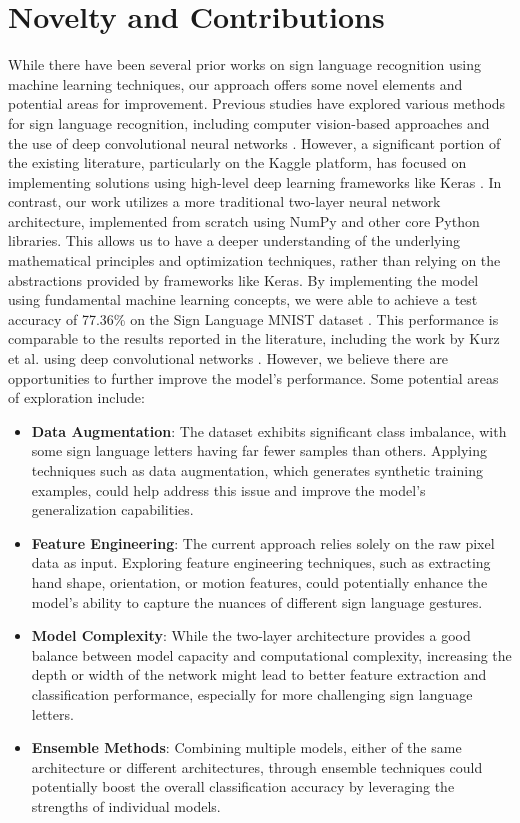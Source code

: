 \documentclass[times,final,english]{revdetua}
\begin{document}
\section{Novelty and Contributions}
While there have been several prior works on sign language recognition using machine learning techniques, our approach offers some novel elements and potential areas for improvement.
Previous studies have explored various methods for sign language recognition, including computer vision-based approaches \cite{garg, mitra} and the use of deep convolutional neural networks \cite{kurz2016using}. However, a significant portion of the existing literature, particularly on the Kaggle platform, has focused on implementing solutions using high-level deep learning frameworks like Keras \cite{kurz2016using}.
In contrast, our work utilizes a more traditional two-layer neural network architecture, implemented from scratch using NumPy and other core Python libraries. This allows us to have a deeper understanding of the underlying mathematical principles and optimization techniques, rather than relying on the abstractions provided by frameworks like Keras.
By implementing the model using fundamental machine learning concepts, we were able to achieve a test accuracy of 77.36\% on the Sign Language MNIST dataset \cite{datamunge2022}. This performance is comparable to the results reported in the literature, including the work by Kurz et al. using deep convolutional networks \cite{kurz2016using}.
However, we believe there are opportunities to further improve the model's performance. Some potential areas of exploration include:

\begin{itemize}
\item \textbf{Data Augmentation}: The dataset exhibits significant class imbalance, with some sign language letters having far fewer samples than others. Applying techniques such as data augmentation, which generates synthetic training examples, could help address this issue and improve the model's generalization capabilities.

\item \textbf{Feature Engineering}: The current approach relies solely on the raw pixel data as input. Exploring feature engineering techniques, such as extracting hand shape, orientation, or motion features, could potentially enhance the model's ability to capture the nuances of different sign language gestures.

\item \textbf{Model Complexity}: While the two-layer architecture provides a good balance between model capacity and computational complexity, increasing the depth or width of the network might lead to better feature extraction and classification performance, especially for more challenging sign language letters.

\item \textbf{Ensemble Methods}: Combining multiple models, either of the same architecture or different architectures, through ensemble techniques could potentially boost the overall classification accuracy by leveraging the strengths of individual models.
\end{itemize}
\end{document}
